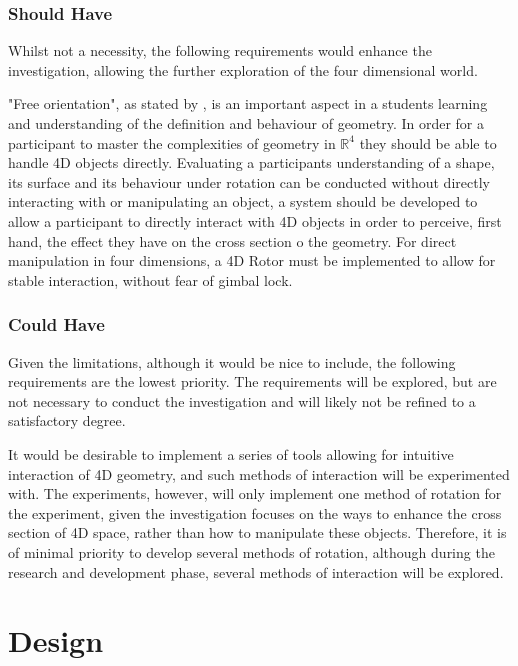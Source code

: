\documentclass{l4proj}
\begin{document}
\subsection*{Should Have}

Whilst not a necessity, the following requirements would enhance the investigation, allowing the further exploration of the four dimensional world.

"Free orientation", as stated by \citet{safrankova_van_2012}, is an important aspect in a students learning and understanding of the definition and behaviour of geometry. In order for a participant to master the complexities of geometry in $\mathbb{R}^4$ they should be able to handle 4D objects directly.
Evaluating a participants understanding of a shape, its surface and its behaviour under rotation can be conducted without directly interacting with or manipulating an object, a system should be developed to allow a participant to directly interact with 4D objects in order to perceive, first hand, the effect they have on the cross section o the geometry.
For direct manipulation in four dimensions, a 4D Rotor must be implemented to allow for stable interaction, without fear of gimbal lock.

\subsection*{Could Have}

Given the limitations, although it would be nice to include, the following requirements are the lowest priority. The requirements will be explored, but are not necessary to conduct the investigation and will likely not be refined to a satisfactory degree.

It would be desirable to implement a series of tools allowing for intuitive interaction of 4D geometry, and such methods of interaction will be experimented with. The experiments, however, will only implement one method of rotation for the experiment, given the investigation focuses on the ways to enhance the cross section of 4D space, rather than how to manipulate these objects. Therefore, it is of minimal priority to develop several methods of rotation, although during the research and development phase, several methods of interaction will be explored.

\chapter{Design}
\end{document}
